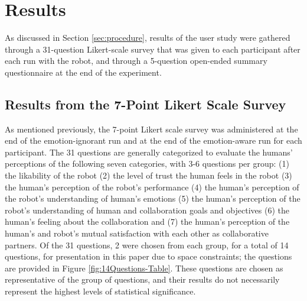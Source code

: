 \documentclass{sig-alternate-05-2015}
\begin{document}
\section{Results}

% 

As discussed in Section \ref{sec:procedure}, results of the user study were
gathered through a 31-question Likert-scale survey that was given to each participant
after each run with the robot, and through a 5-question open-ended summary
questionnaire at the end of the experiment.
\subsection{Results from the 7-Point Likert Scale Survey}
As mentioned previously, the 7-point Likert scale survey was administered at
the end of the emotion-ignorant run and at the end of the emotion-aware run for
each participant. The 31 questions are generally categorized to evaluate the
humans' perceptions of the following seven categories, with 3-6 questions per
group: (1) the likability of the robot (2) the level of trust the human feels
in the robot (3) the human's perception of the robot's performance (4) the
human's perception of the robot's understanding of human's emotions (5) the
human's perception of the robot's understanding of human and collaboration
goals and objectives (6) the human's feeling about the collaboration and (7)
the human's perception of the human's and robot's mutual satisfaction with each
other as collaborative partners. Of the 31 questions, 2 were chosen from each
group, for a total of 14 questions, for presentation in this paper due to space
constraints; the questions are provided in Figure \ref{fig:14Questions-Table}.
These questions are chosen as representative of the group of questions, and
their results do not necessarily represent the highest levels of statistical
significance.
\end{document}

